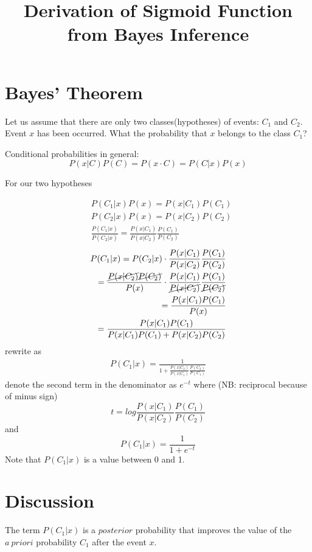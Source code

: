\documentclass[english]{article}
\begin{document}
\title{Derivation of Sigmoid Function from Bayes Inference}

\maketitle

\section{Bayes' Theorem}

Let us assume that there are only two classes(hypotheses) of events: $C_1$ and $C_2$. 
Event $x$ has been occurred. 
What the probability that $x$ belongs to the class $C_1$?

Conditional probabilities in general:
$$
P(x|C) P(C) = P(x \cdot C) = P(C|x)P(x) 
$$

For our two hypotheses

\begin{align*}
& P(C_1|x)P(x) = P(x|C_1)P(C_1) \\
& P(C_2|x)P(x) = P(x|C_2)P(C_2) \\
%
& \frac{P(C_1|x)}{P(C_2|x)} = \frac{P(x|C_1)}{P(x|C_2)}
\frac{P(C_1)}{P(C_2)}
\end{align*}
%
\begin{align*}
P(C_1|x) = P(C_2|x) \cdot
\frac{P(x|C_1)}{P(x|C_2)} \frac{P(C_1)}{P(C_2)} \\
= \frac{\cancel{P(x|C_2)}\cancel{P(C_2)}}{P(x)} \cdot
\frac{P(x|C_1)}{\cancel{P(x|C_2)}} \frac{P(C_1)}{\cancel{P(C_2)}} \\
= \frac{P(x|C_1)P(C_1)}{P(x)} \\
= \frac{P(x|C_1)P(C_1)}{P(x|C_1)P(C_1) + P(x|C_2)P(C_2)}
\end{align*}
%
rewrite as
%
\begin{align*}
P(C_1|x) = \frac1{1 + \frac{P(x|C_2)}{P(x|C_1)}
    \frac{P(C_2)}{P(C_1)}}
\end{align*}
%
denote the second term in the denominator as $e^{-t}$ where 
(NB: reciprocal because of minus sign)
$$
t = log \frac{P(x|C_1)}{P(x|C_2)} \frac{P(C_1)}{P(C_2)}
$$
%
and
%
$$
P(C_1|x) = \frac1{1 + e^{-t}}
$$
Note that $P(C_1|x)$ is a value between 0 and 1.

\section{Discussion}

The term $P(C_1|x)$ is a $posterior$ probability that improves the value of the $a\ priori$ probability $C_1$ after the event $x$.
\end{document}

